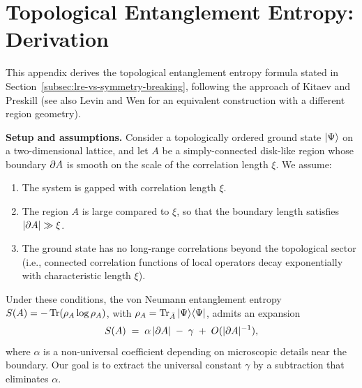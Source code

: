 %
%

\section{Topological Entanglement Entropy: Derivation}
\label{app:tee}

This appendix derives the topological entanglement entropy formula stated in Section~\ref{subsec:lre-vs-symmetry-breaking}, following the approach of Kitaev and Preskill \cite{KitaevPreskill2006TEE} (see also Levin and Wen \cite{LevinWen2006DetectingTO} for an equivalent construction with a different region geometry).

\medskip
\noindent\textbf{Setup and assumptions.}
Consider a topologically ordered ground state $\left|\Psi\right\rangle$ on a two-dimensional lattice, and let $A$ be a simply-connected disk-like region whose boundary $\partial A$ is smooth on the scale of the correlation length $\xi$.  We assume:
\begin{enumerate}
    \item The system is gapped with correlation length $\xi$.
    \item The region $A$ is large compared to $\xi$, so that the boundary length satisfies $|\partial A| \gg \xi$.
    \item The ground state has no long-range correlations beyond the topological sector (i.e., connected correlation functions of local operators decay exponentially with characteristic length $\xi$).
\end{enumerate}

Under these conditions, the von Neumann entanglement entropy $S(A) = -\operatorname{Tr}(\rho_A \log \rho_A)$, with $\rho_A = \operatorname{Tr}_{\bar{A}} \left|\Psi\right\rangle\!\left\langle \Psi\right|$, admits an expansion
\begin{equation}\label{eq:tee-expansion}
    S(A) \;=\; \alpha\, |\partial A| \;-\; \gamma \;+\; O(|\partial A|^{-1}),
\end{equation}
where $\alpha$ is a non-universal coefficient depending on microscopic details near the boundary.  Our goal is to extract the universal constant $\gamma$ by a subtraction that eliminates $\alpha$.

